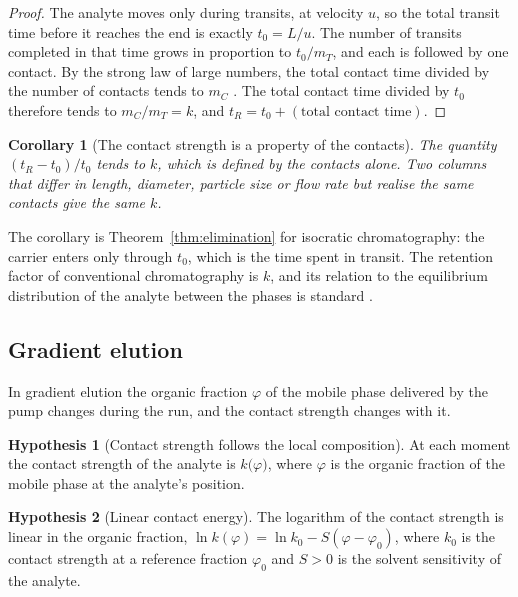 \documentclass[11pt,a4paper]{article}
\newtheorem{corollary}[theorem]{Corollary}
\theoremstyle{definition}
\newtheorem{hypothesis}{Hypothesis}
\theoremstyle{remark}
\begin{document}
\begin{proof}
The analyte moves only during transits, at velocity $u$, so the total transit time before it reaches the end is exactly $t_0=L/u$.
The number of transits completed in that time grows in proportion to $t_0/m_T$, and each is followed by one contact.
By the strong law of large numbers, the total contact time divided by the number of contacts tends to $m_C$ \citep{cox1962}.
The total contact time divided by $t_0$ therefore tends to $m_C/m_T=k$, and $t_R=t_0+(\text{total contact time})$.
\end{proof}

\begin{corollary}[The contact strength is a property of the contacts]
\label{cor:k-invariant}
The quantity $(t_R-t_0)/t_0$ tends to $k$, which is defined by the contacts alone.
Two columns that differ in length, diameter, particle size or flow rate but realise the same contacts give the same $k$.
\end{corollary}

The corollary is Theorem~\ref{thm:elimination} for isocratic chromatography: the carrier enters only through $t_0$, which is the time spent in transit.
The retention factor of conventional chromatography is $k$, and its relation to the equilibrium distribution of the analyte between the phases is standard \citep{giddings1955}.

\subsection{Gradient elution}
\label{sec:gradient}

In gradient elution the organic fraction $\varphi$ of the mobile phase delivered by the pump changes during the run, and the contact strength changes with it.

\begin{hypothesis}[Contact strength follows the local composition]
\label{hyp:local}
At each moment the contact strength of the analyte is $k\bigl(\varphi\bigr)$, where $\varphi$ is the organic fraction of the mobile phase at the analyte's position.
\end{hypothesis}

\begin{hypothesis}[Linear contact energy]
\label{hyp:lss}
The logarithm of the contact strength is linear in the organic fraction, $\ln k(\varphi)=\ln k_0-S(\varphi-\varphi_0)$, where $k_0$ is the contact strength at a reference fraction $\varphi_0$ and $S>0$ is the solvent sensitivity of the analyte.
\end{hypothesis}
\end{document}

